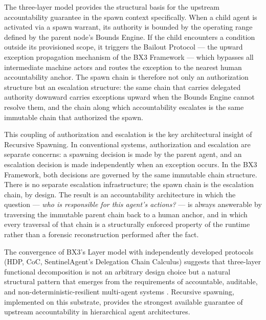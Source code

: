 The three-layer model provides the structural basis for the upstream accountability guarantee in the spawn context specifically. When a child agent is activated via a spawn warrant, its authority is bounded by the operating range defined by the parent node's Bounds Engine. If the child encounters a condition outside its provisioned scope, it triggers the Bailout Protocol \cite{bailoutprotocol2026} — the upward exception propagation mechanism of the BX3 Framework — which bypasses all intermediate machine actors and routes the exception to the nearest human accountability anchor. The spawn chain is therefore not only an authorization structure but an escalation structure: the same chain that carries delegated authority downward carries exceptions upward when the Bounds Engine cannot resolve them, and the chain along which accountability escalates is the same immutable chain that authorized the spawn.

This coupling of authorization and escalation is the key architectural insight of Recursive Spawning. In conventional systems, authorization and escalation are separate concerns: a spawning decision is made by the parent agent, and an escalation decision is made independently when an exception occurs. In the BX3 Framework, both decisions are governed by the same immutable chain structure. There is no separate escalation infrastructure; the spawn chain is the escalation chain, by design. The result is an accountability architecture in which the question — \emph{who is responsible for this agent's actions?} — is always answerable by traversing the immutable parent chain back to a human anchor, and in which every traversal of that chain is a structurally enforced property of the runtime rather than a forensic reconstruction performed after the fact.

The convergence of BX3's Layer model with independently developed protocols (HDP, CoC, SentinelAgent's Delegation Chain Calculus) suggests that three-layer functional decomposition is not an arbitrary design choice but a natural structural pattern that emerges from the requirements of accountable, auditable, and non-deterministic-resilient multi-agent systems \cite{hdp2026,chainofconsciousness2026,sentinelagent2025}. Recursive spawning, implemented on this substrate, provides the strongest available guarantee of upstream accountability in hierarchical agent architectures.